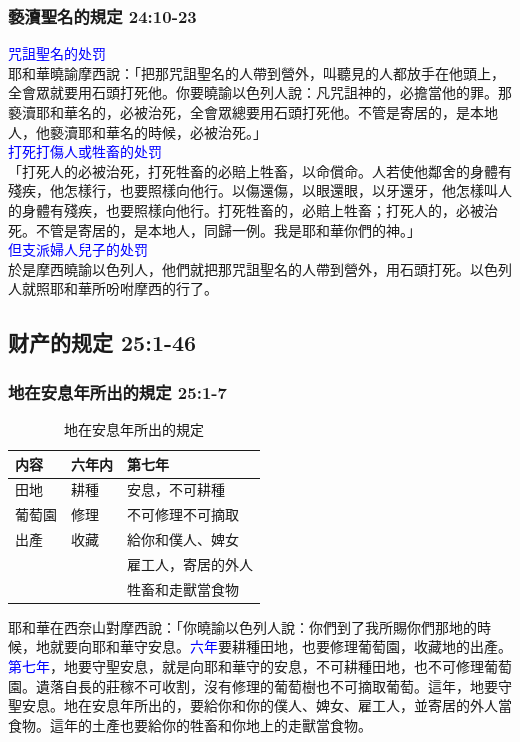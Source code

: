 \subsubsection{褻瀆聖名的規定 24:10-23} 
\textcolor{blue}{咒詛聖名的处罚} \\
耶和華曉諭摩西說：「把那咒詛聖名的人帶到營外，叫聽見的人都放手在他頭上，全會眾就要用石頭打死他。你要曉諭以色列人說：凡咒詛神的，必擔當他的罪。那褻瀆耶和華名的，必被治死，全會眾總要用石頭打死他。不管是寄居的，是本地人，他褻瀆耶和華名的時候，必被治死。」\\
\textcolor{blue}{打死打傷人或牲畜的处罚}\\
「打死人的必被治死，打死牲畜的必賠上牲畜，以命償命。人若使他鄰舍的身體有殘疾，他怎樣行，也要照樣向他行。以傷還傷，以眼還眼，以牙還牙，他怎樣叫人的身體有殘疾，也要照樣向他行。打死牲畜的，必賠上牲畜；打死人的，必被治死。不管是寄居的，是本地人，同歸一例。我是耶和華你們的神。」\\
\textcolor{blue}{但支派婦人兒子的处罚} \\
於是摩西曉諭以色列人，他們就把那咒詛聖名的人帶到營外，用石頭打死。以色列人就照耶和華所吩咐摩西的行了。

\subsection{财产的规定 25:1-46}
\subsubsection{地在安息年所出的規定 25:1-7}
\begin{table}
\vspace*{-5mm}
\centering
\begin{tabular}{l|l|l}
\toprule
 内容&六年内 &第七年 \\\hline
田地&耕種&安息，不可耕種\tabularnewline\hline
葡萄園&修理&不可修理不可摘取\tabularnewline\hline
出產&收藏&給你和僕人、婢女\\
&&雇工人，寄居的外人\\
&&牲畜和走獸當食物\tabularnewline\hline
\bottomrule
\end{tabular}
\caption{地在安息年所出的規定}
\end{table} 
耶和華在西奈山對摩西說：「你曉諭以色列人說：你們到了我所賜你們那地的時候，地就要向耶和華守安息。\textcolor{blue}{六年}要耕種田地，也要修理葡萄園，收藏地的出產。\textcolor{blue}{第七年}，地要守聖安息，就是向耶和華守的安息，不可耕種田地，也不可修理葡萄園。遺落自長的莊稼不可收割，沒有修理的葡萄樹也不可摘取葡萄。這年，地要守聖安息。地在安息年所出的，要給你和你的僕人、婢女、雇工人，並寄居的外人當食物。這年的土產也要給你的牲畜和你地上的走獸當食物。

